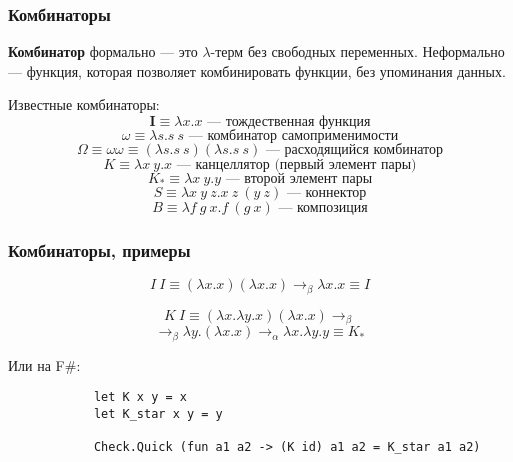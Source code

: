 \documentclass{../../slides-style}
\begin{document}
    \begin{frame}
        \frametitle{Комбинаторы}
        \textbf{Комбинатор} формально --- это $\lambda$-терм без свободных переменных. Неформально --- функция,
        которая позволяет комбинировать функции, без упоминания данных.
        
        Известные комбинаторы:
        $$\textbf{I} \equiv \lambda x.x \mbox{ --- тождественная функция}$$
        $$\omega \equiv \lambda s.s\ s \mbox{ --- комбинатор самоприменимости}$$
        $$\Omega \equiv \omega\omega \equiv (\lambda s.s\ s) (\lambda s.s\ s) \mbox{ --- расходящийся комбинатор}$$
        $$K \equiv \lambda x\ y.x \mbox{ --- канцеллятор (первый элемент пары)}$$
        $$K_\ast \equiv \lambda x\ y.y \mbox{ --- второй элемент пары}$$
        $$S \equiv \lambda x\ y\ z. x\ z\ (y\ z) \mbox{ --- коннектор}$$
        $$B \equiv \lambda f\ g\ x. f\ (g\ x) \mbox{ --- композиция}$$
    \end{frame}
    
    \begin{frame}[fragile]
        \frametitle{Комбинаторы, примеры}
        $$I\ I \equiv (\lambda x.x) (\lambda x.x) \rightarrow_\beta \lambda x.x \equiv I$$
                
        $$K\ I \equiv (\lambda x.\lambda y.x) (\lambda x.x) \rightarrow_\beta $$
        $$\rightarrow_\beta \lambda y.(\lambda x.x) \rightarrow_\alpha \lambda x.\lambda y.y \equiv K_\ast$$

        \vspace{1cm}
        Или на F\#:
        \begin{verbatim}
            let K x y = x
            let K_star x y = y
            
            Check.Quick (fun a1 a2 -> (K id) a1 a2 = K_star a1 a2)
        \end{verbatim}
    \end{frame}
\end{document}

